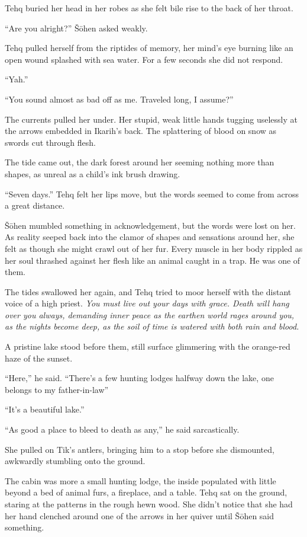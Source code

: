 Tehq buried her head in her robes as she felt bile rise to the back of her throat.

``Are you alright?'' Šōhen asked weakly.

Tehq pulled herself from the riptides of memory, her mind's eye burning like an open wound splashed with sea water. For a few seconds she did not respond.

``Yah.''

``You sound almost as bad off as me. Traveled long, I assume?''

The currents pulled her under. Her stupid, weak little hands tugging uselessly at the arrows embedded in Ikarih's back. The splattering of blood on snow as swords cut through flesh.

The tide came out, the dark forest around her seeming nothing more than shapes, as unreal as a child's ink brush drawing.

``Seven days.'' Tehq felt her lips move, but the words seemed to come from across a great distance.

Šōhen mumbled something in acknowledgement, but the words were lost on her. As reality seeped back into the clamor of shapes and sensations around her, she felt as though she might crawl out of her fur. Every muscle in her body rippled as her soul thrashed against her flesh like an animal caught in a trap. He was one of them.

The tides swallowed her again, and Tehq tried to moor herself with the distant voice of a high priest. \emph{You must live out your days with grace. Death will hang over you always, demanding inner peace as the earthen world rages around you, as the nights become deep, as the soil of time is watered with both rain and blood.}

A pristine lake stood before them, still surface glimmering with the orange-red haze of the sunset.

``Here,'' he said. ``There's a few hunting lodges halfway down the lake, one belongs to my father-in-law''

``It's a beautiful lake.''

``As good a place to bleed to death as any,'' he said sarcastically.

She pulled on Tik's antlers, bringing him to a stop before she dismounted, awkwardly stumbling onto the ground.

The cabin was more a small hunting lodge, the inside populated with little beyond a bed of animal furs, a fireplace, and a table. Tehq sat on the ground, staring at the patterns in the rough hewn wood. She didn't notice that she had her hand clenched around one of the arrows in her quiver until Šōhen said something.

